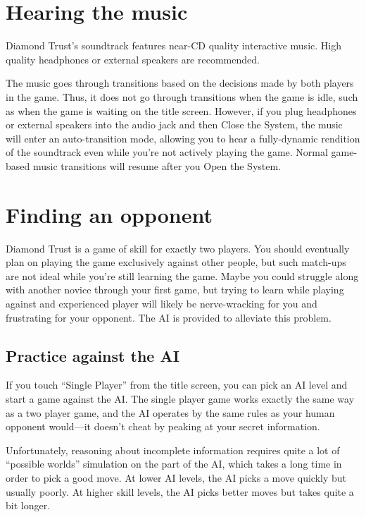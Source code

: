 \documentclass[8pt]{extbook}
\begin{document}
\section{Hearing the music}

Diamond Trust's soundtrack features near-CD quality interactive music.  High quality headphones or external speakers are recommended.  

The music goes through transitions based on the decisions made by both players in the game.  Thus, it does not go through transitions when the game is idle, such as when the game is waiting on the title screen.  However, if you plug headphones or external speakers into the audio jack and then Close the System, the music will enter an auto-transition mode, allowing you to hear a fully-dynamic rendition of the soundtrack even while you're not actively playing the game.  Normal game-based music transitions will resume after you Open the System.

\section{Finding an opponent}

Diamond Trust is a game of skill for exactly two players.  You should eventually plan on playing the game exclusively against other people, but such match-ups are not ideal while you're still learning the game.  Maybe you could struggle along with another novice through your first game, but trying to learn while playing against and experienced player will likely be nerve-wracking for you and frustrating for your opponent.  The AI is provided to alleviate this problem.

\subsection{Practice against the AI}

If you touch ``Single Player'' from the title screen, you can pick an AI level and start a game against the AI.  The single player game works exactly the same way as a two player game, and the AI operates by the same rules as your human opponent would---it doesn't cheat by peaking at your secret information.

Unfortunately, reasoning about incomplete information requires quite a lot of ``possible worlds'' simulation on the part of the AI, which takes a long time in order to pick a good move.  At lower AI levels, the AI picks a move quickly but usually poorly.  At higher skill levels, the AI picks better moves but takes quite a bit longer.
\end{document}
